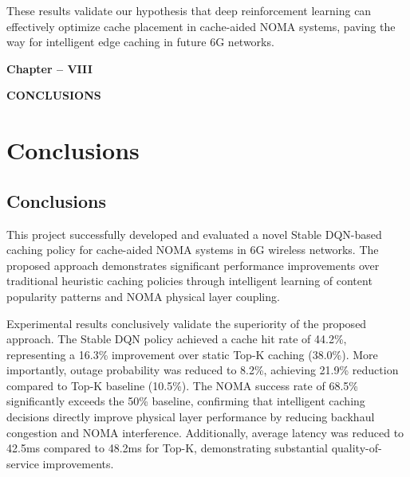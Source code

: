 \documentclass[12pt,a4paper]{article}
\begin{document}
These results validate our hypothesis that deep reinforcement learning can effectively optimize cache placement in cache-aided NOMA systems, paving the way for intelligent edge caching in future 6G networks.

\thispagestyle{plain}


\clearpage

\begin{center}
    \vspace*{10cm}
    
    {\fontsize{16}{19.2}\selectfont\bfseries
    Chapter -- VIII}
    
    \vspace{1cm}
    
    {\fontsize{16}{19.2}\selectfont\bfseries
    CONCLUSIONS}
    
    \vspace*{\fill}
\end{center}

\thispagestyle{plain}


\clearpage

\section{Conclusions}

\subsection{Conclusions}

This project successfully developed and evaluated a novel Stable DQN-based caching policy for cache-aided NOMA systems in 6G wireless networks. The proposed approach demonstrates significant performance improvements over traditional heuristic caching policies through intelligent learning of content popularity patterns and NOMA physical layer coupling.

Experimental results conclusively validate the superiority of the proposed approach. The Stable DQN policy achieved a cache hit rate of 44.2\%, representing a 16.3\% improvement over static Top-K caching (38.0\%). More importantly, outage probability was reduced to 8.2\%, achieving 21.9\% reduction compared to Top-K baseline (10.5\%). The NOMA success rate of 68.5\% significantly exceeds the 50\% baseline, confirming that intelligent caching decisions directly improve physical layer performance by reducing backhaul congestion and NOMA interference. Additionally, average latency was reduced to 42.5ms compared to 48.2ms for Top-K, demonstrating substantial quality-of-service improvements.
\end{document}
